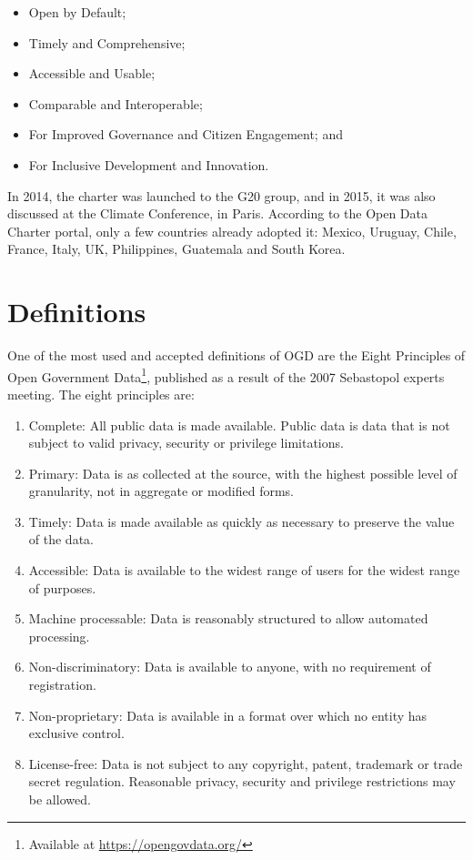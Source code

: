 \begin{itemize}
	\item Open by Default;
    \item Timely and Comprehensive;
    \item Accessible and Usable;
	\item Comparable and Interoperable;
    \item For Improved Governance and Citizen Engagement; and
    \item For Inclusive Development and Innovation.
\end{itemize}

In 2014, the charter was launched to the G20 group, and in 2015, it was also discussed at the Climate Conference, in Paris.
According to the Open Data Charter portal, only a few countries already adopted it: Mexico, Uruguay, Chile, France, Italy, UK, Philippines, Guatemala and South Korea.


\section{Definitions}
\label{sec:definitions}

One of the most used and accepted definitions of OGD are the Eight Principles of Open Government Data\footnote{Available at \url{https://opengovdata.org/}}, published as a result of the 2007 Sebastopol experts meeting. The eight principles are: 

\begin{enumerate}
	\item Complete: All public data is made available. Public data is data that is not subject to valid privacy, security or privilege limitations. 
	\item Primary: Data is as collected at the source, with the highest possible level of granularity, not in aggregate or modified forms. 
	\item Timely: Data is made available as quickly as necessary to preserve the value of the data. 
	\item Accessible: Data is available to the widest range of users for the widest range of purposes. 
	\item Machine processable: Data is reasonably structured to allow automated processing. 
	\item Non-discriminatory: Data is available to anyone, with no requirement of registration. 
	\item Non-proprietary: Data is available in a format over which no entity has exclusive control. 
	\item License-free: Data is not subject to any copyright, patent, trademark or trade secret regulation. Reasonable privacy, security and privilege restrictions may be allowed. 
\end{enumerate}


